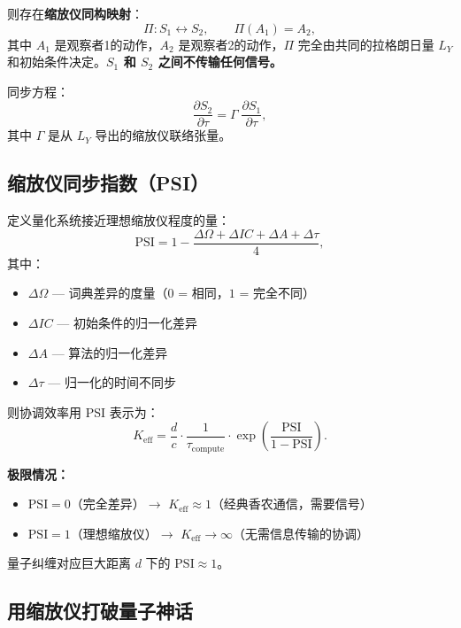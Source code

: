 \documentclass[12pt,a4paper]{article}
\begin{document}
	则存在\textbf{缩放仪同构映射}：
	\[
	\Pi: S_1 \leftrightarrow S_2, \qquad \Pi(A_1) = A_2,
	\]
	其中 \(A_1\) 是观察者1的动作，\(A_2\) 是观察者2的动作，\(\Pi\) 完全由共同的拉格朗日量 \(L_Y\) 和初始条件决定。\textbf{\(S_1\) 和 \(S_2\) 之间不传输任何信号。}
	
	同步方程：
	\[
	\frac{\partial S_2}{\partial \tau} = \Gamma \; \frac{\partial S_1}{\partial \tau},
	\]
	其中 \(\Gamma\) 是从 \(L_Y\) 导出的缩放仪联络张量。
	
	\subsection{缩放仪同步指数（PSI）}
	
	定义量化系统接近理想缩放仪程度的量：
	\[
	\mathrm{PSI} = 1 - \frac{\Delta\Omega + \Delta IC + \Delta A + \Delta\tau}{4},
	\]
	其中：
	\begin{itemize}
		\item \(\Delta\Omega\) — 词典差异的度量（\(0\) = 相同，\(1\) = 完全不同）
		\item \(\Delta IC\) — 初始条件的归一化差异
		\item \(\Delta A\) — 算法的归一化差异
		\item \(\Delta\tau\) — 归一化的时间不同步
	\end{itemize}
	
	则协调效率用 PSI 表示为：
	\[
	K_{\mathrm{eff}} = \frac{d}{c} \cdot \frac{1}{\tau_{\mathrm{compute}}} \cdot \exp\!\left( \frac{\mathrm{PSI}}{1 - \mathrm{PSI}} \right).
	\]
	
	\textbf{极限情况：}
	\begin{itemize}
		\item \(\mathrm{PSI} = 0\)（完全差异）\(\to\) \(K_{\mathrm{eff}} \approx 1\)（经典香农通信，需要信号）
		\item \(\mathrm{PSI} = 1\)（理想缩放仪）\(\to\) \(K_{\mathrm{eff}} \to \infty\)（无需信息传输的协调）
	\end{itemize}
	量子纠缠对应巨大距离 \(d\) 下的 \(\mathrm{PSI} \approx 1\)。
	
	\subsection{用缩放仪打破量子神话}
	
\end{document}
